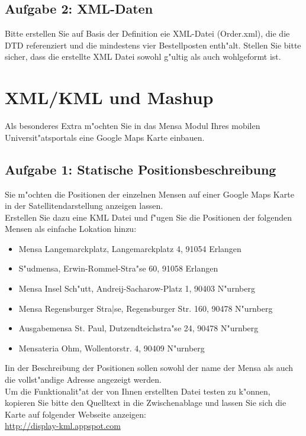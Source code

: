 \subsection{Aufgabe 2: XML-Daten}
Bitte erstellen Sie auf Basis der Definition eie XML-Datei (Order.xml), die die DTD referenziert und die mindestens vier Bestellposten enth"alt.
Stellen Sie bitte sicher, dass die erstellte XML Datei sowohl g"ultig als auch wohlgeformt ist.\\



\section{XML/KML und Mashup}
Als besonderes Extra m"ochten Sie in das Mensa Modul Ihres mobilen Universit"atsportals eine Google Maps Karte einbauen.\\

\subsection{Aufgabe 1: Statische Positionsbeschreibung}
Sie m"ochten die Positionen der einzelnen Mensen auf einer Google Maps Karte in der Satellitendarstellung anzeigen lassen.\\
Erstellen Sie dazu eine KML Datei und f"ugen Sie die Positionen der folgenden Mensen als einfache Lokation hinzu:
\begin{itemize}
    \item Mensa Langemarckplatz, Langemarckplatz 4, 91054 Erlangen
    \item S"udmensa, Erwin-Rommel-Stra"se 60, 91058 Erlangen
    \item Mensa Insel Sch"utt, Andreij-Sacharow-Platz 1, 90403 N"urnberg
    \item Mensa Regensburger Stra|se, Regensburger Str. 160, 90478 N"urnberg
    \item Ausgabemensa St. Paul, Dutzendteichstra"se 24, 90478 N"urnberg
    \item Mensateria Ohm, Wollentorstr. 4, 90409 N"urnberg
\end{itemize}
Iin der Beschreibung der Positionen sollen sowohl der name der Mensa als auch die vollst"andige Adresse angezeigt werden.\\
Um die Funktionalit"at der von Ihnen erstellten Datei testen zu k"onnen, kopieren Sie bitte den Quelltext in die Zwischenablage und lassen Sie sich die Karte auf folgender Webseite anzeigen:\\
\url{http://display-kml.appspot.com}

